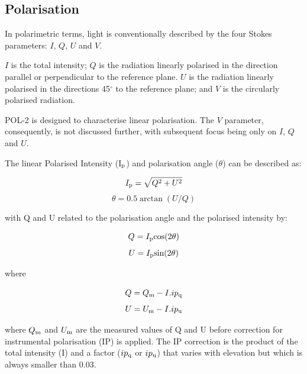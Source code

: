 \subsection*{Polarisation}

In polarimetric terms, light is conventionally described by the four
Stokes parameters: $I$, $Q$, $U$ and $V$.


$I$ is the total intensity; $Q$ is the radiation linearly polarised in
the direction parallel or perpendicular to the reference plane. $U$ is
the radiation linearly polarised in the directions 45$^{\circ }$ to
the reference plane; and $V$ is the circularly polarised radiation.

POL-2 is designed to characterise linear polarisation.  The $V$
parameter, consequently, is not discussed further, with subsequent focus
being only on $I$, $Q$ and $U$.

The linear Polarised Intensity (I$_{\textnormal{p}}$) and  polarisation angle
($\theta$) can be described as:

\begin{equation}
I_{\textnormal{p}} = \sqrt{Q^{2}+U^{2}}
\end{equation}
\begin{equation}
\theta = 0.5\arctan(U/Q)
\end{equation}

with Q and U related to the polarisation angle and the polarised intensity by:

\begin{equation}
Q = I_{\textnormal{p}} \text{cos}(2\theta)
\end{equation}
\begin{equation}
U = I_{\textnormal{p}} \text{sin}(2\theta)
\end{equation}

where

\begin{equation}
Q = Q_{\textnormal{m}} - I. ip_{\textnormal{q}}
\end{equation}
\begin{equation}
U = U_{\textnormal{m}} - I. ip_{\textnormal{u}}
\end{equation}

where $Q_{\textnormal{m}}$ and $U_{\textnormal{m}}$ are the
measured values of Q and U before correction for instrumental
polarisation (IP) is applied. The IP correction is the product of the total
intensity (I) and a factor ($ip_{\textnormal{q}}$ or $ip_{\textnormal{u}}$)
that varies with elevation but which is always smaller than 0.03.

